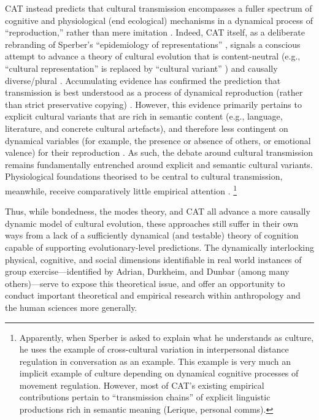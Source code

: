\begin{CJK}{UTF8}{gbsn}
CAT instead predicts that cultural transmission encompasses a fuller spectrum of cognitive and physiological (end ecological) mechanisms in a dynamical process of ``reproduction,'' rather than mere imitation \citep{Claidiere2007,Mesoudi2017}.  Indeed, CAT itself, as a deliberate rebranding of Sperber's ``epidemiology of representations'' \citep{Sperber1996}, signals a conscious attempt to advance a theory of cultural evolution that is content-neutral (e.g., ``cultural representation'' is replaced by ``cultural variant'' \citep{Scott-Phillips2018}) and causally diverse/plural \citep{Claidiere2014}.  Accumulating evidence has confirmed the prediction that transmission is best understood as a process of dynamical reproduction (rather than strict preservative copying) \citep[e.g.,][]{Morin2016,Scott-Phillips2017a}.  However, this evidence primarily pertains to explicit cultural variants that are rich in semantic content (e.g., language, literature, and concrete cultural artefacts), and therefore less contingent on dynamical variables (for example, the presence or absence of others, or emotional valence) for their reproduction \citep[15]{Ramstead2016}.
As such, the debate around cultural transmission remains fundamentally entrenched around explicit and semantic cultural variants. Physiological foundations theorised to be central to cultural transmission, meanwhile, receive comparatively little empirical attention \citep{Ramstead2016,Lerique2016}.
    \footnote{Apparently, when Sperber is asked to explain what he understands as culture, he uses the example of cross-cultural variation in interpersonal distance regulation in conversation as an example.  This example is very much an implicit example of culture depending on dynamical cognitive processes of movement regulation.  However, most of CAT's existing empirical contributions pertain to ``transmission chains'' of explicit linguistic productions rich in semantic meaning (Lerique, personal comms).}

Thus, while bondedness, the modes theory, and CAT all advance a more causally dynamic model of cultural evolution, these approaches still suffer in their own ways from a lack of a sufficiently dynamical (and testable) theory of cognition capable of supporting evolutionary-level predictions.  The dynamically interlocking physical, cognitive, and social dimensions identifiable in real world instances of group exercise---identified by Adrian, Durkheim, and Dunbar (among many others)---serve to expose this theoretical issue, and offer an opportunity to conduct important theoretical and empirical research within anthropology and the human sciences more generally.


\end{CJK}
